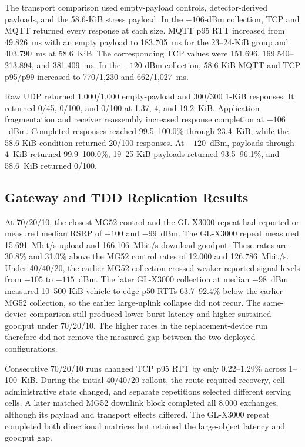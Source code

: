 The transport comparison used empty-payload controls, detector-derived
payloads, and the 58.6-KiB stress payload. In the $-106$-dBm collection, TCP and
MQTT returned every response at each size. MQTT p95 RTT increased from
49.826~ms with an empty payload to 183.705~ms for the 23--24-KiB group and
403.790~ms at 58.6~KiB. The corresponding TCP values were 151.696,
169.540--213.894, and 381.409~ms. In the $-120$-dBm collection, 58.6-KiB MQTT
and TCP p95/p99 increased to 770/1,230 and 662/1,027~ms.

Raw UDP returned 1,000/1,000 empty-payload and 300/300 1-KiB responses. It
returned 0/45, 0/100, and 0/100 at 1.37, 4, and 19.2~KiB. Application
fragmentation and receiver reassembly increased response completion at
$-106$~dBm. Completed responses reached 99.5--100.0\% through 23.4~KiB, while
the 58.6-KiB condition returned 20/100 responses. At $-120$~dBm, payloads
through 4~KiB returned 99.9--100.0\%, 19--25-KiB payloads returned
93.5--96.1\%, and 58.6~KiB returned 0/100.

\subsection{Gateway and TDD Replication Results}

At 70/20/10, the closest MG52 control and the GL-X3000 repeat had reported or
measured median RSRP of $-100$ and $-99$~dBm. The GL-X3000 repeat measured
15.691~Mbit/s upload and 166.106~Mbit/s download goodput. These rates are
30.8\% and 31.0\% above the MG52 control rates of 12.000 and
126.786~Mbit/s. Under 40/40/20, the earlier MG52 collection crossed weaker
reported signal levels from $-105$ to $-115$~dBm. The later GL-X3000
collection at median $-98$~dBm measured 10--500-KiB vehicle-to-edge p50 RTTs
63.7--92.4\% below the earlier MG52 collection, so the earlier large-uplink
collapse did not recur. The same-device comparison still produced lower burst
latency and higher sustained goodput under 70/20/10. The higher rates in the
replacement-device run therefore did not remove the measured gap between the
two deployed configurations.

Consecutive 70/20/10 runs changed TCP p95 RTT by only 0.22--1.29\% across
1--100~KiB. During the initial 40/40/20 rollout, the route required recovery,
cell administrative state changed, and separate repetitions selected different
serving cells. A later matched MG52 downlink block completed all 8,000
exchanges, although its payload and transport effects differed. The GL-X3000
repeat completed both directional matrices but retained the large-object
latency and goodput gap.

